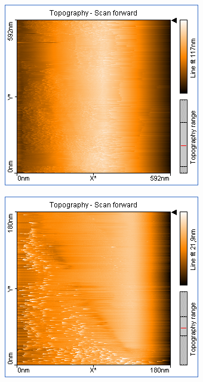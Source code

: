 \centering
\begin{figure}
    \begin{subfigure}[b]{\picwidth}
        \includegraphics[width=\textwidth]{data/Graphit/pic_02_01_600nm}
        \caption{}
        \label{fig:graphit_02_01}
    \end{subfigure}\qquad
    \begin{subfigure}[b]{\picwidth}
        \includegraphics[width=\textwidth]{data/Graphit/pic_02_02_180nm}

\end{subfigure}
\end{figure}
